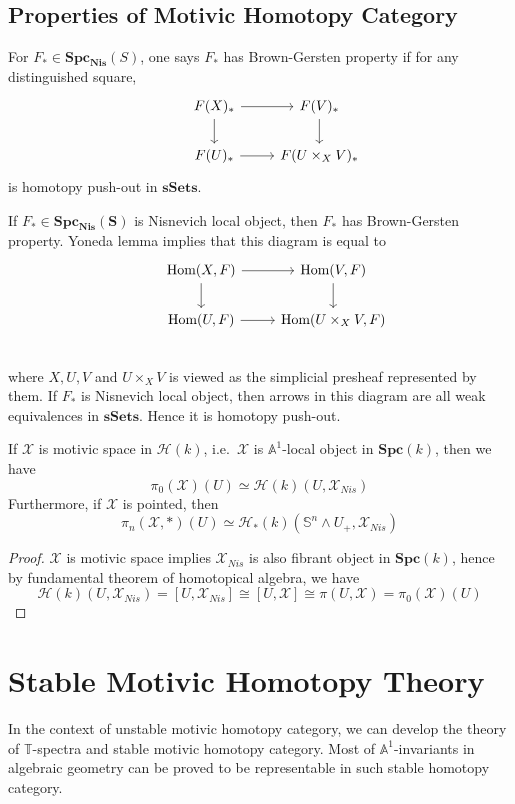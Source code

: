\documentclass[b5paper,10pt]{article}
\begin{document}
\subsection{Properties of Motivic Homotopy Category}
\begin{secdefn}
	For $F_* \in \mathbf{Spc_{Nis}}(S)$, one says $F_*$ has Brown-Gersten property if for any distinguished square,
	\[
	\begin{tikzcd}
	&F(X)_* \ar[r] \ar[d] & F(V)_* \ar[d]\\
	&F(U)_* \ar[r]& F(U \times_X V)_*
	\end{tikzcd}
	\]
	is homotopy push-out in $\mathbf{sSets}$.
\end{secdefn}
If $F_* \in \mathbf{Spc_{Nis}(S)}$ is Nisnevich local object, then $F_*$ has Brown-Gersten property. Yoneda lemma implies that this diagram is equal to 
\[
\begin{tikzcd}
&\hom(X,F) \ar[r] \ar[d]& \hom(V,F) \ar[d]\\
&\hom(U,F) \ar[r]&\hom(U\times_X V,F)\\ 
\end{tikzcd}
\]
where $X, U,V$ and $U \times_X V$ is viewed as the simplicial presheaf represented by them. If $F_*$ is Nisnevich local object, then arrows in this diagram are all weak equivalences in $\mathbf{sSets}$. Hence it is homotopy push-out.
\begin{secprop}
	If $\mathcal{X}$ is motivic space in $\mathcal{H}(k)$, i.e.\ $\mathcal{X}$ is $\mathbb{A}^1$-local object in $\mathbf{Spc}(k)$, then we have
	\[
	\pi_0(\mathcal{X})(U) \simeq \mathcal{H}(k)(U, \mathcal{X}_{Nis}) 
	\]
	Furthermore, if $\mathcal{X}$ is pointed, then
	\[
	\pi_n(\mathcal{X},*)(U) \simeq \mathcal{H}_*(k)(\mathbb{S}^n \wedge U_+,\mathcal{X}_{Nis})
	\]
\end{secprop}
\begin{proof}
	$\mathcal{X}$ is motivic space implies $\mathcal{X}_{Nis}$ is also fibrant object in $\mathbf{Spc}(k)$, hence by fundamental theorem of homotopical algebra, we have 
	\[
	\mathcal{H}(k)(U, \mathcal{X}_{Nis}) = [U,\mathcal{X}_{Nis}] \cong [U,\mathcal{X}]\cong \pi(U,\mathcal{X}) = \pi_0(\mathcal{X})(U)
	\]
\end{proof}
\section{Stable Motivic Homotopy Theory}
In the context of unstable motivic homotopy category, we can develop the theory of $\mathbb{T}$-spectra and stable motivic homotopy category. Most of $\mathbb{A}^1$-invariants in algebraic geometry can be proved to be representable in such stable homotopy category.
\end{document}
